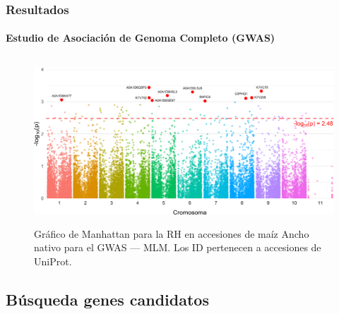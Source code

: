 \documentclass[9pt,aspectratio=169]{beamer}
\begin{document}
\begin{frame}
    \frametitle{Resultados}
    \framesubtitle{Estudio de Asociación de Genoma Completo (GWAS)}
    \begin{figure}
      \centering
      \includegraphics[height=62mm]{resultados-manhattan.png}
      \caption{Gráfico de Manhattan para la RH en accesiones de maíz Ancho nativo para el GWAS — MLM. Los ID pertenecen a accesiones de UniProt.}
      \label{fig:manhattan}
    \end{figure}
\end{frame}

\subsection{Búsqueda genes candidatos}

\end{document}
